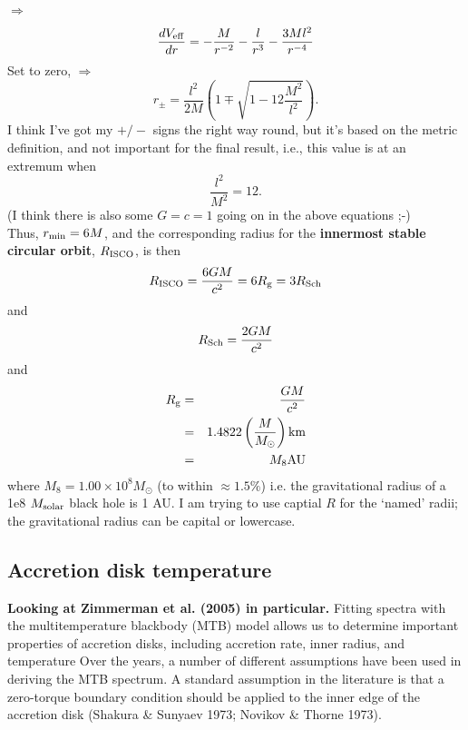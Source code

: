 \documentclass[11pt,a4paper]{article}
\begin{document}
$\Rightarrow$
\begin{equation}
\frac{d V_{\rm eff}}{dr} = - \frac{M}{r^{-2}}  - \frac{l}{r^{3}} - \frac{3 M l^2}{r^{-4}}
\end{equation}
Set to zero, $\Rightarrow$
\begin{equation}
r_{\pm} = \frac{l^2}{2M} \left (1 \mp \sqrt{1 - 12   \frac{M^2}{l^2}     }   \right ).
\end{equation}
I think I've got my $+/-$ signs the right way round, but it's based on the metric definition, 
and not important for the final result, i.e.,  this value is at an extremum when 
\begin{equation}
\frac{l^2}{M^2} = 12.
\end{equation}
(I think there is also some $G=c=1$ going on in the above equations ;-)\\
Thus, $r_{\rm min} = 6 M$, and the corresponding radius for the
{\bf innermost stable circular orbit}, $R_{\rm ISCO}$, is then
\begin{equation}
R_{\rm ISCO} = \frac{6 G M}{c^{2}} = 6 R_{\rm g} =  3 R_{\rm Sch}
\end{equation}
and 
\begin{equation}
R_{\rm Sch} = \frac{2 G M}{c^2}
\end{equation}
and 
\begin{eqnarray}
R_{\rm g}  & = &  \frac{G M}{c^2} \\
                 & = &   1.4822 \left ( \frac{M}{M_{\odot}} \right ) {\rm km}\\
              & = & M_{8} {\rm AU}\\
\end{eqnarray}
where $M_{8} = 1.00 \times10^{8} M_{\odot}$ (to within $\approx1.5\%$)
i.e. the gravitational radius of a 1e8 $M_{\rm solar}$ black hole is 1
AU.  I am trying to use captial $R$ for the `named' radii; the
gravitational radius can be capital or lowercase.

\subsection{Accretion disk temperature}
{\bf Looking at Zimmerman et al. (2005) in particular.}
Fitting spectra with the multitemperature blackbody (MTB) model allows
us to determine important properties of accretion disks, including
accretion rate, inner radius, and temperature
Over the years, a number of different assumptions have been used in
deriving the MTB spectrum. A standard assumption in the literature is
that a zero-torque boundary condition should be applied to the inner
edge of the accretion disk (Shakura \& Sunyaev 1973; Novikov \& Thorne
1973).
\end{document}
